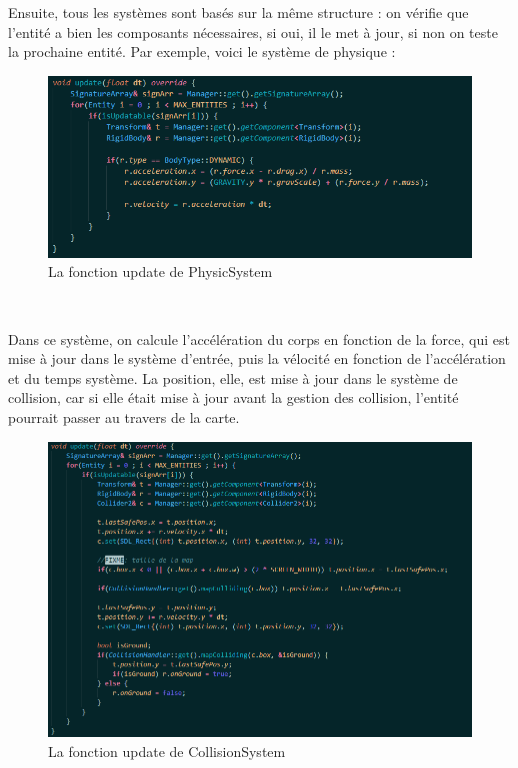 \documentclass[12pt, openany]{report}
\begin{document}
Ensuite, tous les syst\`emes sont bas\'es sur la m\^eme structure : on v\'erifie que l'entit\'e a bien les composants n\'ecessaires, si oui, il le met \`a jour, si non on teste la prochaine entit\'e. Par exemple, voici le syst\`eme de physique :
\begin{figure}[!h]
\centering
\includegraphics[scale=0.7]{physicsys.png}
\caption{La fonction update de PhysicSystem}
\end{figure}
\\
\par Dans ce syst\`eme, on calcule l'acc\'el\'eration du corps en fonction de la force, qui est mise \`a jour dans le syst\`eme d'entr\'ee, puis la v\'elocit\'e en fonction de l'acc\'el\'eration et du temps syst\`eme. La position, elle, est mise \`a jour dans le syst\`eme de collision, car si elle \'etait mise \`a jour avant la gestion des collision, l'entit\'e pourrait passer au travers de la carte.
\begin{figure}[!h]
\centering
\includegraphics[scale=0.7]{collisionsys.png}
\caption{La fonction update de CollisionSystem}
\end{figure}
\end{document}
